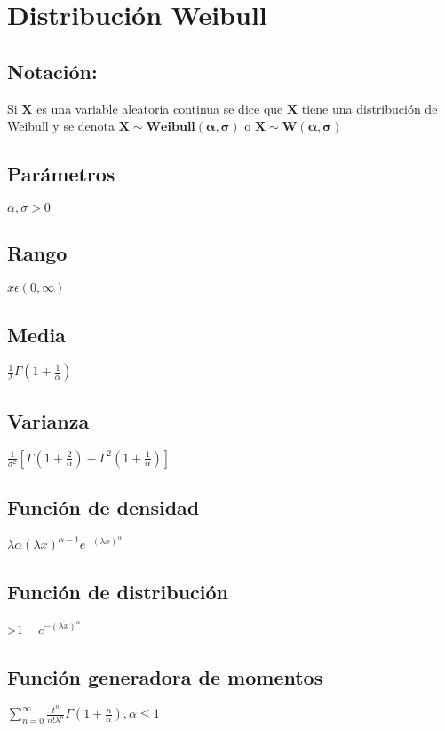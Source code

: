 \documentclass[es-lat]{article}
\begin{document}
\section{Distribución Weibull}
\subsection{Notación:}

Si $\mathbf{X}$ es una variable aleatoria continua se dice que $\mathbf{X}$ tiene una distribución de Weibull y se denota $\mathbf{X\sim Weibull(\alpha,\sigma)}$ o $\mathbf{X\sim W(\alpha,\sigma)}$

\subsection{Parámetros}
$\alpha,\sigma>0$

\subsection{Rango}
$x\epsilon(0,\infty)$

\subsection{Media}
$\frac{1}{\lambda}\Gamma(1+\frac{1}{\alpha})$

\subsection{Varianza}
$\frac{1}{\sigma^{2}}[\Gamma(1+\frac{2}{\alpha})-\Gamma^{2}(1+\frac{1}{\alpha})]$

\subsection{Función de densidad}
$\lambda\alpha(\lambda x)^{\alpha-1}e^{-(\lambda x)^{\alpha}}$

\subsection{Función de distribución}
>$1-e^{-(\lambda x)^{\alpha}}$

\subsection{Función generadora de momentos}
$\sum_{n=0}^{\infty}\frac{t^{n}}{n!\lambda^{n}}\Gamma(1+\frac{n}{\alpha}), \alpha\leq1$
\end{document}
